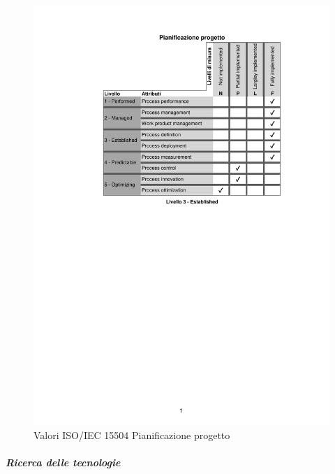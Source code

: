 \begin{figure}[H]
	\centering
	\includegraphics[scale=1]{images/resoconto/RP/pianificazioneprogetto-RP.pdf}
	\caption{Valori ISO/IEC 15504 Pianificazione progetto}	
\end{figure}
\newpage
\subparagraph{Ricerca delle tecnologie}
\noindent
